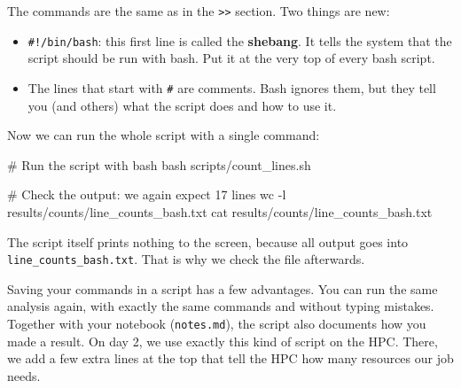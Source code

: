 \documentclass[
  letterpaper,
  DIV=11,
  numbers=noendperiod]{scrreprt}
\newenvironment{Shaded}{}{}
\newcommand{\AttributeTok}[1]{\textcolor[rgb]{0.84,0.23,0.29}{#1}}
\newcommand{\CommentTok}[1]{\textcolor[rgb]{0.42,0.45,0.49}{#1}}
\newcommand{\FunctionTok}[1]{\textcolor[rgb]{0.44,0.26,0.76}{#1}}
\newcommand{\NormalTok}[1]{\textcolor[rgb]{0.14,0.16,0.18}{#1}}
\providecommand{\tightlist}{%
  \setlength{\itemsep}{0pt}\setlength{\parskip}{0pt}}
\begin{document}
The commands are the same as in the
\texttt{\textgreater{}\textgreater{}} section. Two things are new:

\begin{itemize}
\tightlist
\item
  \texttt{\#!/bin/bash}: this first line is called the \textbf{shebang}.
  It tells the system that the script should be run with bash. Put it at
  the very top of every bash script.
\item
  The lines that start with \texttt{\#} are comments. Bash ignores them,
  but they tell you (and others) what the script does and how to use it.
\end{itemize}

Now we can run the whole script with a single command:

\begin{Shaded}
\begin{Highlighting}[]
\CommentTok{\# Run the script with bash}
\FunctionTok{bash}\NormalTok{ scripts/count\_lines.sh}

\CommentTok{\# Check the output: we again expect 17 lines}
\FunctionTok{wc} \AttributeTok{{-}l}\NormalTok{ results/counts/line\_counts\_bash.txt}
\FunctionTok{cat}\NormalTok{ results/counts/line\_counts\_bash.txt}
\end{Highlighting}
\end{Shaded}

The script itself prints nothing to the screen, because all output goes
into \texttt{line\_counts\_bash.txt}. That is why we check the file
afterwards.

Saving your commands in a script has a few advantages. You can run the
same analysis again, with exactly the same commands and without typing
mistakes. Together with your notebook (\texttt{notes.md}), the script
also documents how you made a result. On day 2, we use exactly this kind
of script on the HPC. There, we add a few extra lines at the top that
tell the HPC how many resources our job needs.
\end{document}
